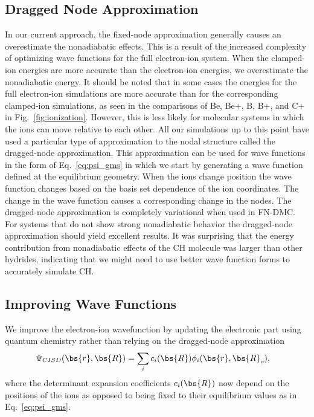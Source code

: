 \subsection{Dragged Node Approximation}
In our current approach, the fixed-node approximation generally causes an overestimate the nonadiabatic effects. This is a result of the increased complexity of optimizing wave functions for the full electron-ion system. When the clamped-ion energies are more accurate than the electron-ion energies, we overestimate the nonadiabatic energy. It should be noted that in some cases the energies for the full electron-ion simulations are more accurate than for the corresponding clamped-ion simulations, as seen in the comparisons of Be, Be+, B, B+, and C+ in Fig.~\ref{fig:ionization}.
However, this is less likely for molecular systems in which the ions can move relative to each other.
All our simulations up to this point have used a particular type of approximation to the nodal structure called the dragged-node approximation.
This approximation can be used for wave functions in the form of Eq.~\ref{eq:psi_gms} in which we start by generating a wave function defined at the equilibrium geometry.
When the ions change position the wave function changes based on the basis set dependence of the ion coordinates.
The change in the wave function causes a corresponding change in the nodes.
The dragged-node approximation is completely variational when used in FN-DMC.
For systems that do not show strong nonadiabatic behavior the dragged-node approximation should yield excellent results.
It was surprising that the energy contribution from nonadiabatic effects of the CH molecule was larger than other hydrides, indicating that we might need to use better wave function forms to accurately simulate CH.

\subsection{Improving Wave Functions}
We improve the electron-ion wavefunction by updating the electronic part using quantum chemistry rather than relying on the dragged-node approximation
\begin{align}
\Psi_{CISD}(\bs{r},\bs{R}) &= \sum_i c_i(\bs{R}) \phi_i(\bs{r},\bs{R}_o), \label{eq:nonbo-best-psi}
\end{align}
where the determinant expansion coefficients $c_i(\bs{R})$ now depend on the positions of the ions as opposed to being fixed to their equilibrium values as in Eq.~\ref{eq:psi_gms}.

